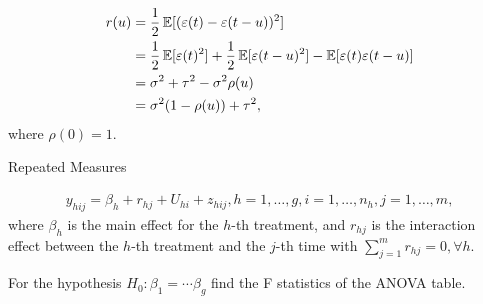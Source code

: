 \documentclass[UTF8,a4paper,10pt]{article}
\begin{document}
      \begin{solution}\,
        \begin{equation*}
          \begin{aligned}
            r(u) 
            &= \frac{1}{2}\operatorname{\mathbb{E}}[(\varepsilon(t)-\varepsilon(t-u))^2]\\
            &= \frac{1}{2}\operatorname{\mathbb{E}}[\varepsilon(t)^2] +\frac{1}{2}\operatorname{\mathbb{E}}[\varepsilon(t-u)^2]-\operatorname{\mathbb{E}}[\varepsilon(t)\varepsilon(t-u)]\\
            &= \sigma^2+\tau^2 -\sigma^2\rho(u)\\
            &= \sigma^2(1-\rho(u))+\tau^2,
          \end{aligned}
        \end{equation*}
        where \(\rho(0) = 1\).

      \end{solution}

  \begin{Problem}[]{Repeated Measures}

    \begin{equation*}
      \begin{aligned}
        y_{hij} = \beta_{h}+r_{hj}+ U_{hi}+z_{hij}, h = 1,\ldots,g, i=1,\ldots,n_h, j=1,\ldots,m,
      \end{aligned}
    \end{equation*}
    where \(\beta_h\) is the main effect for the \(h\)-th treatment, and \(r_{hj}\) is the interaction effect between the \(h\)-th treatment and the \(j\)-th time with \(\sum_{j=1}^{m}r_{hj} = 0 ,\forall h\).

    For the hypothesis \(H_0:\beta_1 = \cdots\beta_g\)
find the F statistics of the ANOVA table.

    
  \end{Problem} 
\end{document}
